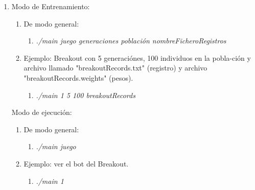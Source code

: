 \begin{enumerate}
    \item Modo de Entrenamiento: 
    \begin{enumerate}
        \item De modo general:
        \begin{enumerate}
            \item \textit{./main juego generaciones población nombreFicheroRegistros}
        \end{enumerate}
        \item Ejemplo: Breakout con 5 generaciónes, 100 individuos en la pobla-ción y archivo llamado "breakoutRecords.txt" (registro) y archivo "breakoutRecords.weights" (pesos).
        \begin{enumerate}
            \item \textit{./main 1 5 100 breakoutRecords}
        \end{enumerate}
    \end{enumerate}
    \Item Modo de ejecución:
    \begin{enumerate}
        \item De modo general:
        \begin{enumerate}
            \item \textit{./main juego}
        \end{enumerate}
        \item Ejemplo: ver el bot del Breakout.
        \begin{enumerate}
            \item \textit{./main 1}
        \end{enumerate}
    \end{enumerate}
\end{enumerate}

\newpage